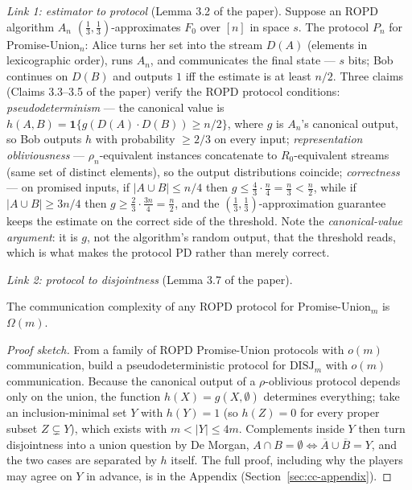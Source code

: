 \emph{Link 1: estimator to protocol} (Lemma 3.2 of the paper). Suppose an ROPD
algorithm $A_n$ $(\tfrac13,\tfrac13)$-approximates $F_0$ over $[n]$ in space $s$. The
protocol $P_n$ for Promise-Union$_n$: Alice turns her set into the stream $D(A)$
(elements in lexicographic order), runs $A_n$, and communicates the final state ---
$s$ bits; Bob continues on $D(B)$ and outputs $1$ iff the estimate is at least
$n/2$. Three claims (Claims 3.3--3.5 of the paper) verify the ROPD protocol
conditions: \emph{pseudodeterminism} --- the canonical value is
$h(A,B) = \mathbf{1}\{g(D(A)\cdot D(B)) \ge n/2\}$, where $g$ is $A_n$'s canonical
output, so Bob outputs $h$ with probability $\ge 2/3$ on every input;
\emph{representation obliviousness} --- $\rho_n$-equivalent instances concatenate to
$R_0$-equivalent streams (same set of distinct elements), so the output
distributions coincide; \emph{correctness} --- on promised inputs, if
$|A \cup B| \le n/4$ then $g \le \tfrac43 \cdot \tfrac{n}{4} = \tfrac{n}{3} <
\tfrac{n}{2}$, while if $|A \cup B| \ge 3n/4$ then
$g \ge \tfrac23 \cdot \tfrac{3n}{4} = \tfrac{n}{2}$, and the
$(\tfrac13,\tfrac13)$-approximation guarantee keeps the estimate on the correct side
of the threshold. Note the \emph{canonical-value argument}: it is $g$, not the
algorithm's random output, that the threshold reads, which is what makes the
protocol PD rather than merely correct.

\emph{Link 2: protocol to disjointness} (Lemma 3.7 of the paper).

\begin{lemma}\label{lem:cc-promise-union}
The communication complexity of any ROPD protocol for Promise-Union$_m$ is
$\Omega(m)$. \eop
\end{lemma}

\begin{proof}[Proof sketch]
From a family of ROPD Promise-Union protocols with $o(m)$ communication, build a
pseudodeterministic protocol for $\mathrm{DISJ}_m$ with $o(m)$ communication. Because
the canonical output of a $\rho$-oblivious protocol depends only on the union, the
function $h(X) = g(X, \emptyset)$ determines everything; take an inclusion-minimal
set $Y$ with $h(Y) = 1$ (so $h(Z) = 0$ for every proper subset $Z \subsetneq Y$),
which exists with $m < |Y| \le 4m$. Complements inside $Y$ then turn disjointness
into a union question by De Morgan,
$A \cap B = \emptyset \iff \overline{A} \cup \overline{B} = Y$, and the two cases
are separated by $h$ itself. The full proof, including why the players may agree on
$Y$ in advance, is in the Appendix (Section~\ref{sec:cc-appendix}).
\end{proof}

